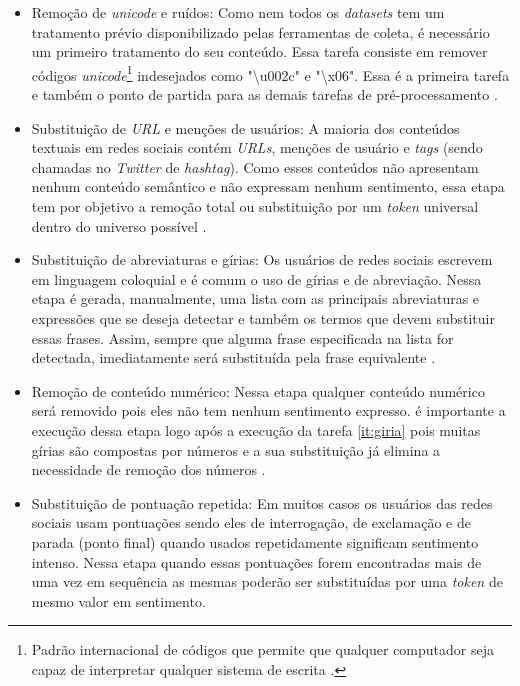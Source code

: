 \begin{itemize}
\item Remoção de \textit{unicode} e ruídos: Como nem todos os \textit{datasets} tem um tratamento prévio disponibilizado pelas ferramentas de coleta, é necessário um primeiro tratamento do seu conteúdo. Essa tarefa consiste em remover códigos \textit{unicode}\footnote{ Padrão internacional de códigos que permite que qualquer computador seja capaz de interpretar qualquer sistema de escrita \cite{0321480910}.} indesejados   como "\textbackslash u002c" e "\textbackslash x06". Essa é a primeira tarefa e também o ponto de partida para as demais tarefas de pré-processamento \cite{SYMEONIDIS2018298}.

\item Substituição de \textit{URL} e menções de usuários: A maioria dos conteúdos textuais em redes sociais contém \textit{URLs}, menções de usuário e \textit{tags} (sendo chamadas no \textit{Twitter} de \textit{hashtag}). Como esses conteúdos não apresentam nenhum conteúdo semântico e não expressam nenhum sentimento, essa etapa tem por objetivo a remoção total ou substituição por um \textit{token} universal dentro do universo possível \cite{Khan2014}.
\label{it:giria}

\item Substituição de abreviaturas e gírias: Os usuários de redes sociais escrevem em linguagem coloquial e é comum o uso de gírias e de abreviação. Nessa etapa é gerada, manualmente, uma lista com as principais abreviaturas e expressões que se deseja detectar e também os termos que devem substituir essas frases. Assim, sempre que alguma frase especificada na lista for detectada, imediatamente será substituída pela frase equivalente \cite{Kouloumpis}.

\item Remoção de conteúdo numérico: Nessa etapa qualquer conteúdo numérico será removido pois eles não tem nenhum sentimento expresso. é importante a execução dessa etapa logo após a execução da tarefa \ref{it:giria} pois muitas gírias são compostas por números e a sua substituição já elimina a necessidade de remoção dos números \cite{He:2011:AEP:2002472.2002489}.

\item Substituição de pontuação repetida: Em muitos casos os usuários das redes sociais usam pontuações sendo eles de interrogação, de exclamação e de parada (ponto final) quando usados repetidamente significam sentimento intenso. Nessa etapa quando essas pontuações forem encontradas mais de uma vez em sequência as mesmas poderão ser substituídas por uma \textit{token} de mesmo valor em sentimento.


\end{itemize}
